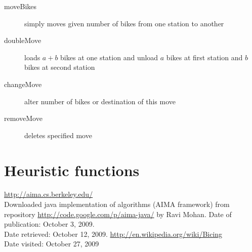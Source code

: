 \documentclass[a4paper,10pt]{report}
\begin{document}
\begin{description}
 \item[moveBikes] simply moves given number of bikes from one station to another
\item[doubleMove] loads \( a + b \) bikes at one station and unload \(a\) bikes at first station and \(b\) bikes at second station
\item[changeMove] alter number of bikes or destination of this move
\item[removeMove] deletes specified move
 \end{description}

\section{Heuristic functions}


\clearpage
\begin{thebibliography}{9}
		\url{http://aima.cs.berkeley.edu/} \\
		{Downloaded java implementation of algorithms (AIMA framework) from repository \url{http://code.google.com/p/aima-java/} by Ravi Mohan. Date of publication: October 3, 2009. \\
		Date retrieved: October 12, 2009. }
\url{http://en.wikipedia.org/wiki/Bicing}\\
{Date visited: October 27, 2009}


\end{thebibliography}
\end{document}
